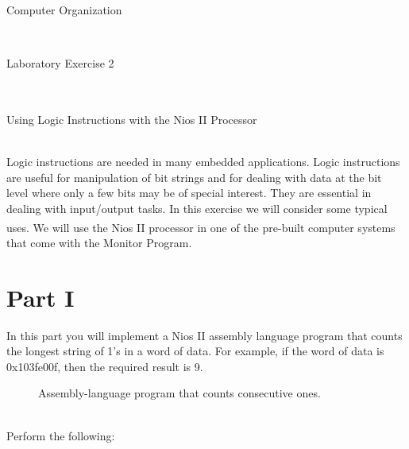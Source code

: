 \documentclass[epsfig,10pt,fullpage]{article}
\newcommand{\LabNum}{2}
\begin{document}
\centerline{\huge Computer Organization}
~\\
\centerline{\huge Laboratory Exercise \LabNum}
~\\
\centerline{\large Using Logic Instructions with the Nios\textsuperscript{\textregistered} II Processor}
~\\


Logic instructions are needed in many embedded applications.  Logic instructions are useful 
for manipulation of bit strings and for dealing with data at the bit level where only a 
few bits may be of special interest.  They are essential in dealing with input/output tasks.
In this exercise we will consider some typical uses.
We will use the Nios\textsuperscript{\textregistered} II processor in one of the pre-built computer systems that come with the Monitor Program.

\section*{Part I}
In this part you will implement a Nios II assembly language program that counts the longest 
string of 1's in a word of data. For example, if the word of data is {\sf 0x103fe00f}, then 
the required result is 9.

\begin{figure}[H]
\begin{center}
\begin{minipage}[t]{16.5 cm}

\end{minipage}
\end{center}
\caption{Assembly-language program that counts consecutive ones.}
\label{fig:code}
\end{figure}

~\\
Perform the following:
\end{document}
